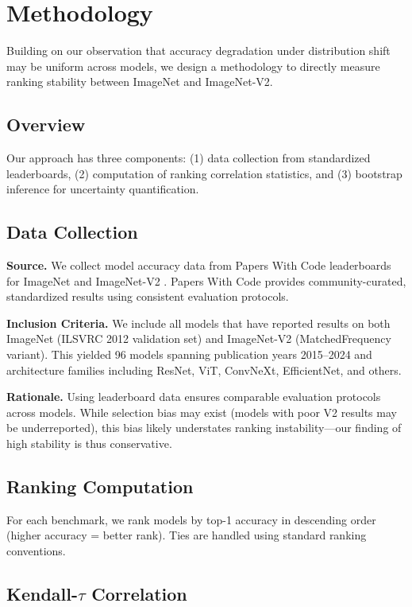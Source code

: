 \section{Methodology}
\label{sec:methodology}

Building on our observation that accuracy degradation under distribution shift may be uniform across models, we design a methodology to directly measure ranking stability between ImageNet and ImageNet-V2.

\subsection{Overview}

Our approach has three components: (1) data collection from standardized leaderboards, (2) computation of ranking correlation statistics, and (3) bootstrap inference for uncertainty quantification.

\subsection{Data Collection}

\textbf{Source.} We collect model accuracy data from Papers With Code leaderboards for ImageNet and ImageNet-V2 \cite{paperswithcode}. Papers With Code provides community-curated, standardized results using consistent evaluation protocols.

\textbf{Inclusion Criteria.} We include all models that have reported results on both ImageNet (ILSVRC 2012 validation set) and ImageNet-V2 (MatchedFrequency variant). This yielded 96 models spanning publication years 2015--2024 and architecture families including ResNet, ViT, ConvNeXt, EfficientNet, and others.

\textbf{Rationale.} Using leaderboard data ensures comparable evaluation protocols across models. While selection bias may exist (models with poor V2 results may be underreported), this bias likely understates ranking instability---our finding of high stability is thus conservative.

\subsection{Ranking Computation}

For each benchmark, we rank models by top-1 accuracy in descending order (higher accuracy = better rank). Ties are handled using standard ranking conventions.

\subsection{Kendall-$\tau$ Correlation}

